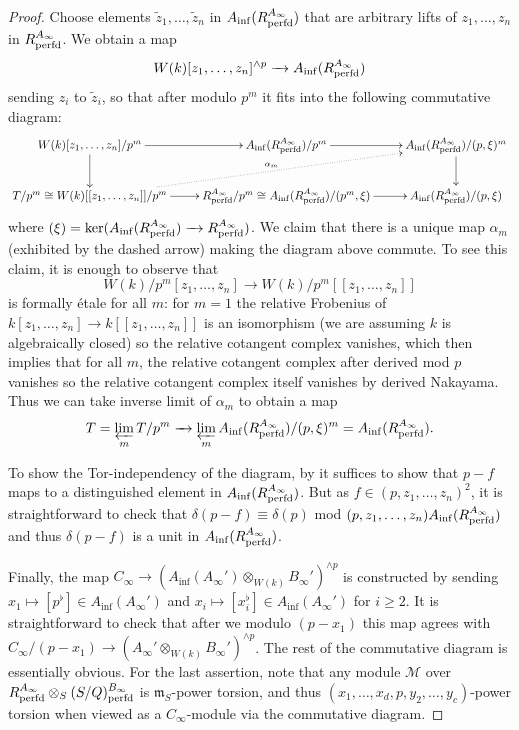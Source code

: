 \documentclass[12pt]{amsart}
\numberwithin{equation}{theorem}
\numberwithin{equation}{theorem}
\renewcommand{\m}{\mathfrak{m}}
\newcommand{\perfd}{\textnormal{perfd}}
\begin{document}
\begin{proof}
Choose elements $\widetilde{z}_1,\dots,\widetilde{z}_n$ in $A_{\inf}(R^{A_\infty}_\perfd)$ that are arbitrary lifts of $z_1,\dots,z_n$ in $R^{A_\infty}_\perfd$. We obtain a map 
$$W(k)[z_1,\dots,z_n]^{\wedge p} \to A_{\inf}(R^{A_\infty}_\perfd)$$
sending $z_i$ to $\widetilde{z}_i$,
so that after modulo $p^m$ it fits into the following commutative diagram:
\[\xymatrix{
W(k)[z_1,\dots,z_n]/p^m \ar[r] \ar[d] & A_{\inf}(R^{A_\infty}_\perfd)/p^m \ar[r] & A_{\inf}(R^{A_\infty}_\perfd)/(p,\xi)^m \ar[d] \\
T/p^m\cong W(k)[[z_1,\dots,z_n]]/p^m \ar[r] \ar@{.>}[rru]^{\alpha_m} & R^{A_\infty}_\perfd/p^m \cong A_{\inf}(R^{A_\infty}_\perfd)/(p^m,\xi) \ar[r] & A_{\inf}(R^{A_\infty}_\perfd)/(p,\xi) 
}\]
where $(\xi)=\ker(A_{\inf}(R^{A_\infty}_\perfd) \to R^{A_\infty}_\perfd)$. We claim that there is a unique map $\alpha_m$ (exhibited by the dashed arrow) making the diagram above commute. To see this claim, it is enough to observe that
$$W(k)/p^m[z_1,\dots,z_n] \to W(k)/p^m[[z_1,\dots,z_n]]$$
is formally \'etale for all $m$: for $m=1$ the relative Frobenius of $k[z_1,\dots,z_n] \to k[[z_1,\dots,z_n]]$ is an isomorphism (we are assuming $k$ is algebraically closed) so the relative cotangent complex vanishes, which then implies that for all $m$, the relative cotangent complex after derived mod $p$ vanishes so the relative cotangent complex itself vanishes by derived Nakayama. Thus we can take inverse limit of $\alpha_m$ to obtain a map
$$T=\varprojlim_m T/p^m \to \varprojlim_m A_{\inf}(R^{A_\infty}_\perfd)/(p,\xi)^m = A_{\inf}(R^{A_\infty}_\perfd).$$

To show the Tor-independency of the diagram, by \cite[Lemma 2.24]{BhattScholzePrismaticCohomology2022} it suffices to show that $p-f$ maps to a distinguished element in $A_{\inf}(R^{A_\infty}_\perfd)$. But as $f\in (p,z_1,\dots,z_n)^2$, it is straightforward to check that $\delta(p-f)\equiv\delta(p)$ mod $(p,z_1,\dots,z_n)A_{\inf}(R^{A_\infty}_\perfd)$ and thus $\delta(p-f)$ is a unit in $A_{\inf}(R^{A_\infty}_\perfd)$.

Finally, the map $C_\infty \to (A_{\inf}(A_\infty') \otimes_{W(k)}B_\infty')^{\wedge p}$ is constructed by sending $x_1\mapsto [p^\flat]\in A_{\inf}(A_\infty')$ and $x_i\mapsto [x_i^\flat] \in A_{\inf}(A_\infty')$ for $i\geq 2$. It is straightforward to check that after we modulo $(p-x_1)$ this map agrees with $C_\infty/(p-x_1) \to (A_\infty'\otimes_{W(k)}B_\infty')^{\wedge p}$. The rest of the commutative diagram is essentially obvious. For the last assertion, note that any module $\mathcal{M}$ over $R^{A_\infty}_\perfd \otimes_S(S/Q)^{B_\infty}_\perfd$ is $\m_S$-power torsion, and thus $(x_1,\dots,x_d,p,y_2,\dots,y_c)$-power torsion when viewed as a $C_\infty$-module via the commutative diagram.
\end{proof}
\end{document}
